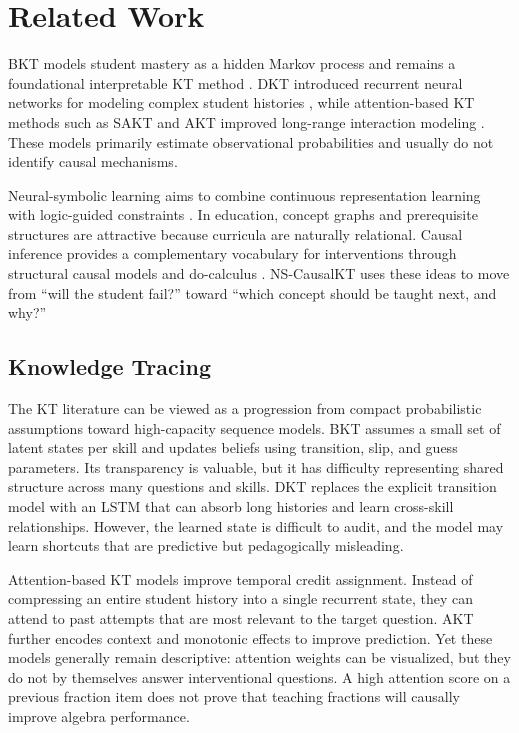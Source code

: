 \documentclass[conference]{IEEEtran}
\begin{document}
\section{Related Work}
BKT models student mastery as a hidden Markov process and remains a foundational interpretable KT method \cite{corbett1994knowledge}. DKT introduced recurrent neural networks for modeling complex student histories \cite{piech2015deep}, while attention-based KT methods such as SAKT and AKT improved long-range interaction modeling \cite{pandey2019self,ghosh2020context}. These models primarily estimate observational probabilities and usually do not identify causal mechanisms.

Neural-symbolic learning aims to combine continuous representation learning with logic-guided constraints \cite{garcez2019neural}. In education, concept graphs and prerequisite structures are attractive because curricula are naturally relational. Causal inference provides a complementary vocabulary for interventions through structural causal models and do-calculus \cite{pearl2009causality}. NS-CausalKT uses these ideas to move from ``will the student fail?'' toward ``which concept should be taught next, and why?''

\subsection{Knowledge Tracing}
The KT literature can be viewed as a progression from compact probabilistic assumptions toward high-capacity sequence models. BKT assumes a small set of latent states per skill and updates beliefs using transition, slip, and guess parameters. Its transparency is valuable, but it has difficulty representing shared structure across many questions and skills. DKT replaces the explicit transition model with an LSTM that can absorb long histories and learn cross-skill relationships. However, the learned state is difficult to audit, and the model may learn shortcuts that are predictive but pedagogically misleading.

Attention-based KT models improve temporal credit assignment. Instead of compressing an entire student history into a single recurrent state, they can attend to past attempts that are most relevant to the target question. AKT further encodes context and monotonic effects to improve prediction. Yet these models generally remain descriptive: attention weights can be visualized, but they do not by themselves answer interventional questions. A high attention score on a previous fraction item does not prove that teaching fractions will causally improve algebra performance.
\end{document}
